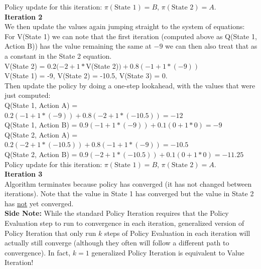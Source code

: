 \documentclass[11pt]{article}
\begin{document}
\begin{enumerate}
\begin{enumerate}[label=\alph*)]
{        Policy update for this iteration: $\pi(\text{State 1}) = B$, $\pi(\text{State 2}) = A$. \\
    
        \textbf{Iteration 2} \\
        We then update the values again jumping straight to the system of equations: \\
        For V(State 1) we can note that the first iteration (computed above as Q(State 1, Action B)) has the value remaining the same at $-9$ we can then also treat that as a constant in the State 2 equation. \\
        V(State 2) = $0.2 (-2 + 1 * $V(State 2)$) + 0.8 (-1 + 1 * (-9))$  \\
        
        V(State 1) = -9, V(State 2) = -10.5, V(State 3) = 0.\\
        
        Then update the policy by doing a one-step lookahead, with the values that were just computed: \\
        Q(State 1, Action A) = $0.2 (-1 + 1 * (-9)) + 0.8 (-2 + 1 * (-10.5)) = -12$ \\
        Q(State 1, Action B) = $0.9 (-1 + 1 * (-9)) + 0.1 (0 + 1 * 0) = -9$  \\
        Q(State 2, Action A) = $0.2 (-2 + 1 * (-10.5)) + 0.8 (-1 + 1 * (-9)) = -10.5$  \\
        Q(State 2, Action B) = $0.9 (-2 + 1 * (-10.5)) + 0.1 (0 + 1 * 0) = -11.25$  \\
        
        Policy update for this iteration: $\pi(\text{State 1}) = B$, $\pi(\text{State 2}) = A$. \\
        
        \textbf{Iteration 3} \\
        Algorithm terminates because policy has converged (it has not changed between iterations). Note that the value in State 1 has converged but the value in State 2 has \underline{not} yet converged.\\
        
        \textbf{Side Note:} While the standard Policy Iteration requires that the Policy Evaluation step to run to convergence in each iteration, generalized version of Policy Iteration that only run $k$ steps of Policy Evaluation in each iteration will actually still converge (although they often will follow a different path to convergence). In fact, $k = 1$ generalized Policy Iteration is equivalent to Value Iteration!
    }
  \fi

\end{enumerate}
\end{enumerate}
\clearpage
\end{document}
